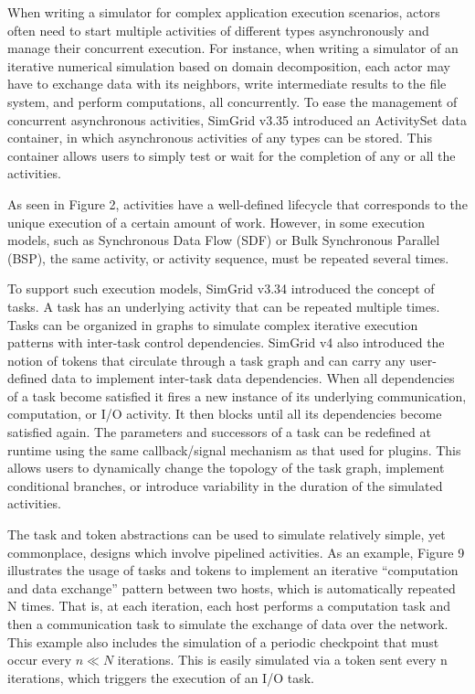 \documentclass[
]{article}
\begin{document}
When writing a simulator for complex application execution scenarios,
actors often need to start multiple activities of different types
asynchronously and manage their concurrent execution. For instance, when
writing a simulator of an iterative numerical simulation based on domain
decomposition, each actor may have to exchange data with its neighbors,
write intermediate results to the file system, and perform computations,
all concurrently. To ease the management of concurrent asynchronous
activities, SimGrid v3.35 introduced an ActivitySet data container, in
which asynchronous activities of any types can be stored. This container
allows users to simply test or wait for the completion of any or all the
activities.

As seen in Figure 2, activities have a well-defined lifecycle that
corresponds to the unique execution of a certain amount of work.
However, in some execution models, such as Synchronous Data Flow (SDF)
or Bulk Synchronous Parallel (BSP), the same activity, or activity
sequence, must be repeated several times.

To support such execution models, SimGrid v3.34 introduced the concept
of tasks. A task has an underlying activity that can be repeated
multiple times. Tasks can be organized in graphs to simulate complex
iterative execution patterns with inter-task control dependencies.
SimGrid v4 also introduced the notion of tokens that circulate through a
task graph and can carry any user-defined data to implement inter-task
data dependencies. When all dependencies of a task become satisfied it
fires a new instance of its underlying communication, computation, or
I/O activity. It then blocks until all its dependencies become satisfied
again. The parameters and successors of a task can be redefined at
runtime using the same callback/signal mechanism as that used for
plugins. This allows users to dynamically change the topology of the
task graph, implement conditional branches, or introduce variability in
the duration of the simulated activities.

The task and token abstractions can be used to simulate relatively
simple, yet commonplace, designs which involve pipelined activities. As
an example, Figure 9 illustrates the usage of tasks and tokens to
implement an iterative ``computation and data exchange'' pattern between
two hosts, which is automatically repeated N times. That is, at each
iteration, each host performs a computation task and then a
communication task to simulate the exchange of data over the network.
This example also includes the simulation of a periodic checkpoint that
must occur every \(n \ll N\) iterations. This is easily simulated via a
token sent every n iterations, which triggers the execution of an I/O
task.
\end{document}

